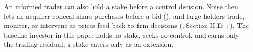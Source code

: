 
An informed trader can also hold a stake before a control decision.
Noise then lets an acquirer conceal share purchases before a bid
(), and large holders
trade, monitor, or intervene as prices feed back to firm decisions
(,
Section II.E; ;
). The baseline investor
in this paper holds no stake, seeks no control, and earns only the
trading residual; a stake enters only as an extension.

